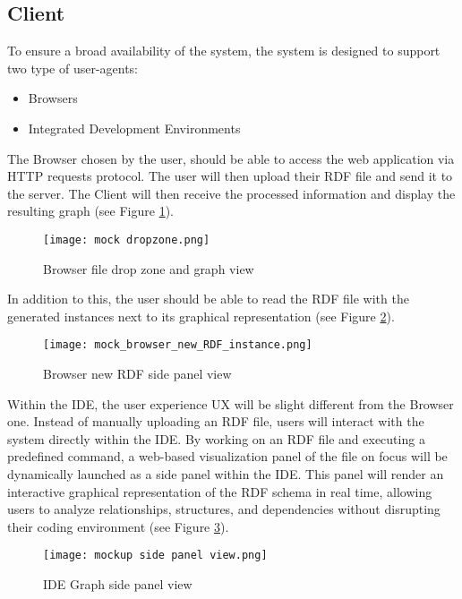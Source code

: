 \subsection{Client\label{sec:reqsuba}}
To ensure a broad availability of the system, the system is designed to support two type of user-agents:
\begin{itemize}
    \item Browsers
    \item Integrated Development Environments 
\end{itemize}
The Browser chosen by the user, should be able to access the web application via HTTP requests protocol.
The user will then upload their RDF file and send it to the server.
The Client will then receive the processed information and display the resulting graph (see Figure \ref{fig:BrowserGraphView}).

\begin{figure}[htb]
    \centering
    \texttt{[image: mock dropzone.png]}\\
    \caption{Browser file drop zone and graph view }\label{fig:BrowserGraphView}
  \end{figure}

In addition to this, the user should be able to read the RDF file with the generated instances next to its graphical representation (see Figure \ref{fig:BrowserRDFReader}).

\begin{figure}[htb]
    \centering
    \texttt{[image: mock\_browser\_new\_RDF\_instance.png]}\\
    \caption{Browser new RDF side panel view }\label{fig:BrowserRDFReader}
  \end{figure}

Within the IDE, the user experience UX will be slight different from the Browser one. Instead of manually uploading an RDF file, users will interact with the system directly within the IDE. By working on an RDF file and executing a predefined command, a web-based visualization panel of the file on focus will be dynamically launched as a side panel within the IDE. This panel will render an interactive graphical representation of the RDF schema in real time, allowing users to analyze relationships, structures, and dependencies without disrupting their coding environment (see Figure \ref{fig:IDEGraphView}). 

\begin{figure}[H]
    \centering
    \texttt{[image: mockup side panel view.png]}\\
    \caption{IDE Graph side panel view}\label{fig:IDEGraphView}
  \end{figure}

